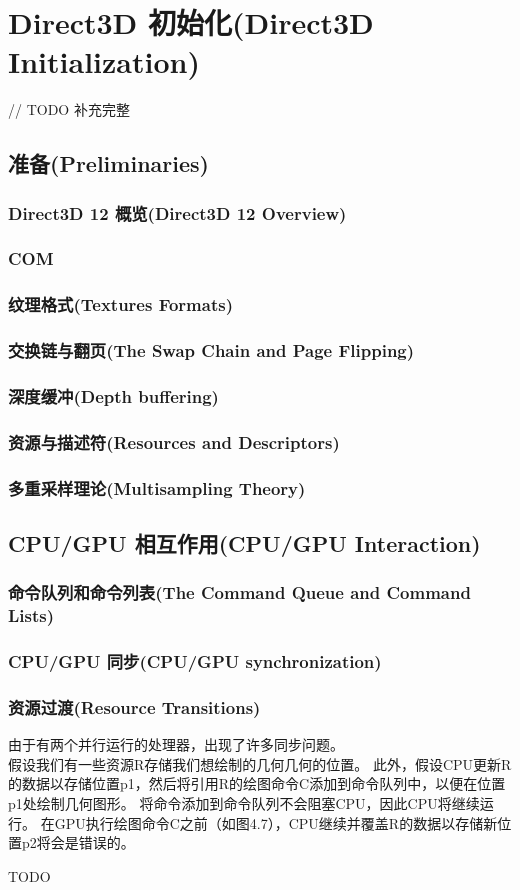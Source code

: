 \chapter{Direct3D 初始化(Direct3D Initialization)}
// TODO 补充完整
\section{准备(Preliminaries)}
\subsection{Direct3D 12 概览(Direct3D 12 Overview)}
\subsection{COM}
\subsection{纹理格式(Textures Formats)}
\subsection{交换链与翻页(The Swap Chain and Page Flipping)}
\subsection{深度缓冲(Depth buffering)}
\subsection{资源与描述符(Resources and Descriptors)}
\subsection{多重采样理论(Multisampling Theory)}

\section{CPU/GPU 相互作用(CPU/GPU Interaction)}
\subsection{命令队列和命令列表(The Command Queue and Command Lists)}
\subsection{CPU/GPU 同步(CPU/GPU synchronization)}
\subsection{资源过渡(Resource Transitions)}
\begin{flushleft}
由于有两个并行运行的处理器，出现了许多同步问题。\\
假设我们有一些资源R存储我们想绘制的几何几何的位置。 此外，假设CPU更新R的数据以存储位置p1，然后将引用R的绘图命令C添加到命令队列中，以便在位置p1处绘制几何图形。 将命令添加到命令队列不会阻塞CPU，因此CPU将继续运行。 在GPU执行绘图命令C之前（如图4.7），CPU继续并覆盖R的数据以存储新位置p2将会是错误的。
\end{flushleft}
TODO
